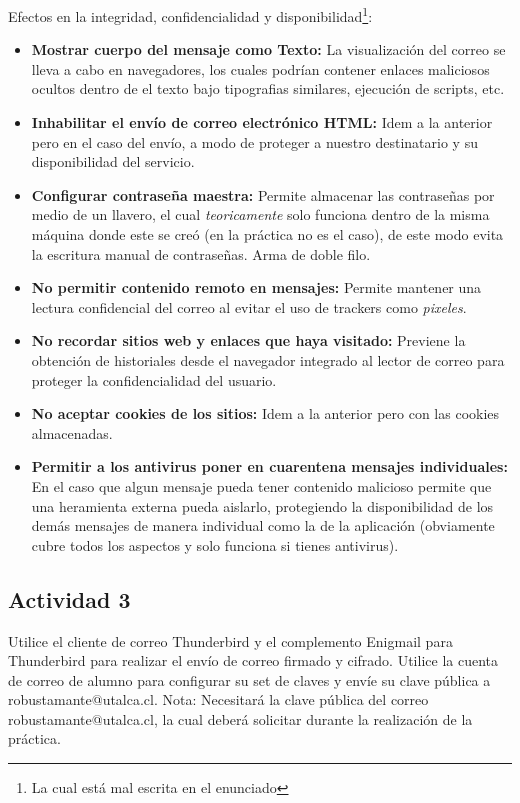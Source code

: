 \documentclass[11pt]{utalcaDoc}
\begin{document}
Efectos en la integridad, confidencialidad y disponibilidad\footnote{La cual está mal escrita en el enunciado}:
\begin{itemize}
	\item \textbf{Mostrar cuerpo del mensaje como Texto:} La visualización del correo se lleva a cabo en navegadores, los cuales podrían contener enlaces maliciosos ocultos dentro de el texto bajo tipografias similares, ejecución de scripts, etc.
	\item \textbf{Inhabilitar el envío de correo electrónico HTML:} Idem a la anterior pero en el caso del envío, a modo de proteger a nuestro destinatario y su disponibilidad del servicio.
	\item \textbf{Configurar contraseña maestra:} Permite almacenar las contraseñas por medio de un llavero, el cual \textit{teoricamente} solo funciona dentro de la misma máquina donde este se creó (en la práctica no es el caso), de este modo evita la escritura manual de contraseñas. Arma de doble filo.
	\item \textbf{No permitir contenido remoto en mensajes:} Permite mantener una lectura confidencial del correo al evitar el uso de trackers como \textit{pixeles}.
	\item \textbf{No recordar sitios web y enlaces que haya visitado:} Previene la obtención de historiales desde el navegador integrado al lector de correo para proteger la confidencialidad del usuario.
	\item \textbf{No aceptar cookies de los sitios:} Idem a la anterior pero con las cookies almacenadas.
	\item \textbf{Permitir a los antivirus poner en cuarentena mensajes individuales:} En el caso que algun mensaje pueda tener contenido malicioso permite que una heramienta externa pueda aislarlo, protegiendo la disponibilidad de los demás mensajes de manera individual como la de la aplicación (obviamente cubre todos los aspectos y solo funciona si tienes antivirus).
\end{itemize}

\subsection{Actividad 3}{Utilice el cliente de correo Thunderbird y el complemento Enigmail para Thunderbird para realizar el envío de correo firmado y cifrado. Utilice la cuenta de correo de alumno para configurar su set de claves y envíe su clave pública a robustamante@utalca.cl. Nota: Necesitará la clave pública del correo robustamante@utalca.cl, la cual deberá solicitar durante la realización de la práctica.}
\end{document}
